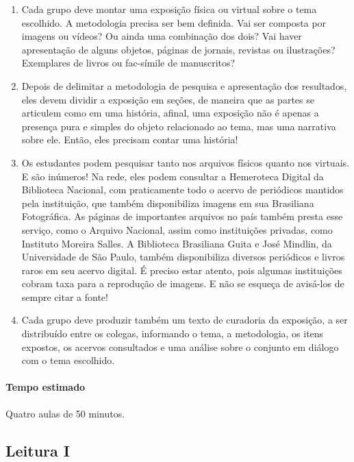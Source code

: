 \documentclass[12pt]{extarticle}
\begin{document}
\begin{enumerate}
\item
Cada grupo deve montar uma exposição física ou virtual sobre o tema
escolhido. A metodologia precisa ser bem definida. Vai ser composta por
imagens ou vídeos? Ou ainda uma combinação dos dois? Vai haver
apresentação de alguns objetos, páginas de jornais, revistas ou
ilustrações? Exemplares de livros ou fac-símile de manuscritos?

\item
Depois de delimitar a metodologia de pesquisa e apresentação dos
resultados, eles devem dividir a exposição em seções, de maneira que as
partes se articulem como em uma história, afinal, uma exposição não é
apenas a presença pura e simples do objeto relacionado ao tema, mas uma
narrativa sobre ele. Então, eles precisam contar uma história!

\item
Os estudantes podem pesquisar tanto nos arquivos físicos quanto nos
virtuais. E são inúmeros! Na rede, eles podem consultar a Hemeroteca
Digital da Biblioteca Nacional, com praticamente todo o acervo de
periódicos mantidos pela instituição, que também disponibiliza imagens
em sua Brasiliana Fotográfica. As páginas de importantes arquivos no
país também presta esse serviço, como o Arquivo Nacional, assim como
instituições privadas, como Instituto Moreira Salles. A Biblioteca
Brasiliana Guita e José Mindlin, da Universidade de São Paulo, também
disponibiliza diversos periódicos e livros raros em seu acervo digital.
É preciso estar atento, pois algumas instituições cobram taxa para a reprodução
de imagens. E não se esqueça de avisá-los de sempre citar a fonte!

\item
Cada grupo deve produzir também um texto de curadoria da exposição, a
ser distribuído entre os colegas, informando o tema, a metodologia, os
itens expostos, os acervos consultados e uma análise sobre o conjunto em
diálogo com o tema escolhido.
\end{enumerate}

\paragraph{Tempo estimado} Quatro aulas de 50 minutos.



\subsection{Leitura I}
\end{document}
